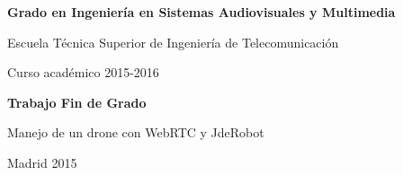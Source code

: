 \thispagestyle{empty}

\vspace{2cm}

\begin{figure}[htb]
\centerline{}
\end{figure}

\vspace{8mm}
\begin{center}
{\Large {\bf Grado en Ingeniería en Sistemas Audiovisuales y Multimedia}}
\vspace{8mm}

{\large Escuela Técnica Superior de Ingeniería de Telecomunicación}
\vspace{8mm}

{\large Curso académico 2015-2016}

\vspace{1.0cm}

{\large {\bf Trabajo Fin de Grado}} 

\vspace{2cm}
{\Huge {Manejo de un drone con WebRTC y JdeRobot}}

\end{center}

\vspace{4cm}

\vspace{0.5cm}
\begin{center}
\large{Madrid 2015}
\end{center}

